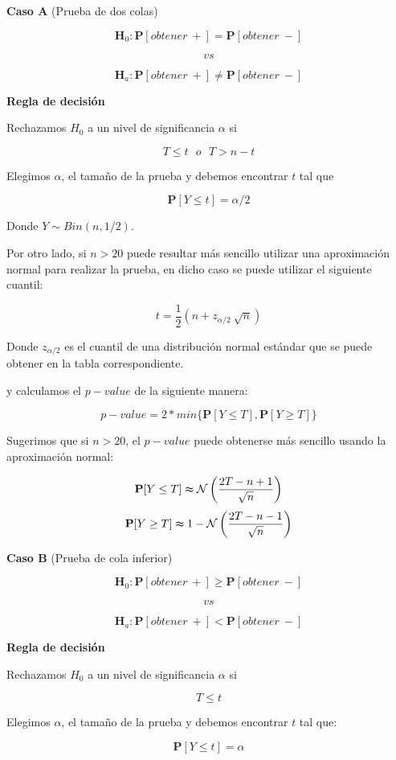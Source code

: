 \documentclass[
  a4paper,
  oneside,
  openany]{book}
\begin{document}
\textbf{Caso A} (Prueba de dos colas)

\[\textbf{H}_0: \mathbf{P}[obtener\ +]= \mathbf{P}[obtener\ -]\]

\[vs\]

\[\textbf{H}_a: \mathbf{P}[obtener\ +] \neq \mathbf{P}[obtener\ -]\]

\textbf{Regla de decisión}

Rechazamos \(H_0\) a un nivel de significancia \(\alpha\) si

\[T \leq t \ \ \  o \ \ \ T>n-t\]

Elegimos \(\alpha\), el tamaño de la prueba y debemos encontrar \(t\) tal que

\[\mathbf{P}[Y \leq t]=\alpha/2\]

Donde \(Y \sim Bin (n,1/2)\).

Por otro lado, si \(n>20\) puede resultar más sencillo utilizar una aproximación normal para realizar la prueba, en dicho caso se puede utilizar el siguiente cuantil:

\[t=\frac{1}{2}\left(n+z_{\alpha/2}\ \sqrt{n}\right)\]

Donde \(z_{\alpha/2}\) es el cuantil de una distribución normal estándar que se puede obtener en la tabla correspondiente.

y calculamos el \(p-value\) de la siguiente manera:

\[p-value=2*min\{\mathbf{P}[Y\leq T],\mathbf{P}[Y\geq T]\}\]

Sugerimos que si \(n > 20\), el \(p-value\) puede obtenerse más sencillo usando la aproximación normal:

\[\mathbf{P}[Y\leq T] \thickapprox  \mathcal{N}\left(\frac{2T-n+1}{\sqrt{n}}\right)\]
\[\mathbf{P}[Y\geq T] \thickapprox 1- \mathcal{N} \left(\frac{2T-n-1}{\sqrt{n}}\right)\]

\textbf{Caso B} (Prueba de cola inferior)

\[\textbf{H}_0: \mathbf{P}[obtener\ +] \geq \mathbf{P}[obtener\ -]\]

\[vs\]

\[\textbf{H}_a: \mathbf{P}[obtener\ +] < \mathbf{P}[obtener\ -]\]

\textbf{Regla de decisión}

Rechazamos \(H_0\) a un nivel de significancia \(\alpha\) si

\[T \leq t\]

Elegimos \(\alpha\), el tamaño de la prueba y debemos encontrar \(t\) tal que:

\[\mathbf{P}[Y \leq t]=\alpha\]
\end{document}
